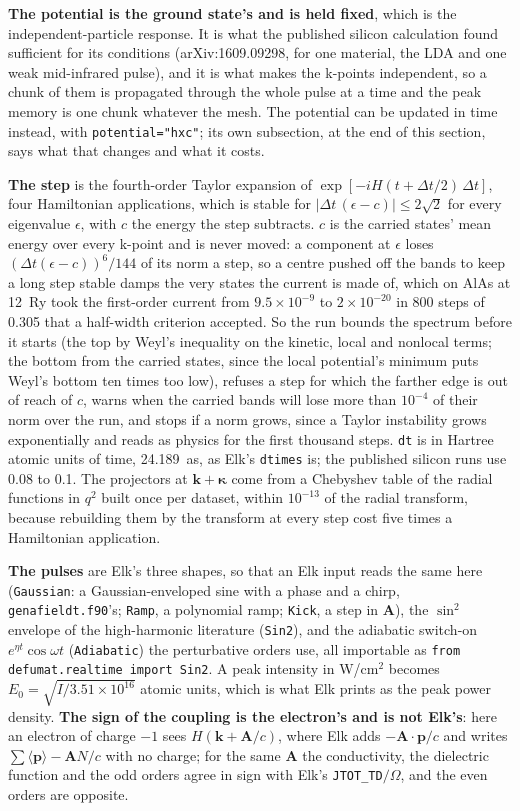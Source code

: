 \documentclass[11pt,a4paper]{article}
\newcommand{\code}[1]{\texttt{\small #1}}
\begin{document}
\textbf{The potential is the ground state's and is held fixed}, which is the
independent-particle response. It is what the published silicon calculation
found sufficient for its conditions (arXiv:1609.09298, for one material, the
LDA and one weak mid-infrared pulse), and it is what makes the k-points
independent, so a chunk of them is propagated through the whole pulse at a
time and the peak memory is one chunk whatever the mesh. The potential can be
updated in time instead, with \code{potential="hxc"}; its own subsection, at the
end of this section, says what that changes and what it costs.

\textbf{The step} is the fourth-order Taylor expansion of
$\exp[-iH(t+\Delta t/2)\,\Delta t]$, four Hamiltonian applications, which is
stable for $|\Delta t\,(\epsilon-c)| \le 2\sqrt2$ for every eigenvalue $\epsilon$,
with $c$ the energy the step subtracts. $c$ is the carried states' mean energy
over every k-point and is never moved: a component at $\epsilon$ loses
$(\Delta t(\epsilon-c))^6/144$ of its norm a step, so a centre pushed off the
bands to keep a long step stable damps the very states the current is made of,
which on AlAs at 12~Ry took the first-order current from $9.5\times10^{-9}$ to
$2\times10^{-20}$ in 800 steps of 0.305 that a half-width criterion accepted. So
the run bounds the spectrum before it starts (the top by Weyl's inequality on the
kinetic, local and nonlocal terms; the bottom from the carried states, since the
local potential's minimum puts Weyl's bottom ten times too low), refuses a step
for which the farther edge is out of reach of $c$, warns when the carried bands
will lose more than $10^{-4}$ of their norm over the run, and stops if a norm
grows, since a Taylor instability grows exponentially and reads as physics for
the first thousand steps. \code{dt} is in Hartree atomic units of time, 24.189~as, as Elk's
\code{dtimes} is; the published silicon runs use 0.08 to 0.1. The projectors at
$\mathbf k+\boldsymbol\kappa$ come from a Chebyshev table of the radial
functions in $q^2$ built once per dataset, within $10^{-13}$ of the radial
transform, because rebuilding them by the transform at every step cost five
times a Hamiltonian application.

\textbf{The pulses} are Elk's three shapes, so that an Elk input reads the same
here (\code{Gaussian}: a Gaussian-enveloped sine with a phase and a chirp,
\code{genafieldt.f90}'s; \code{Ramp}, a polynomial ramp; \code{Kick}, a step in
$\mathbf A$), the $\sin^2$ envelope of the high-harmonic literature
(\code{Sin2}), and the adiabatic switch-on $e^{\eta t}\cos\omega t$
(\code{Adiabatic}) the perturbative orders use, all importable as
\code{from defumat.realtime import Sin2}. A peak intensity in W/cm$^2$ becomes
$E_0 = \sqrt{I/3.51\times10^{16}}$ atomic units, which is what Elk prints as the
peak power density. \textbf{The sign of the coupling is the electron's and is not
Elk's}: here an electron of charge $-1$ sees $H(\mathbf k+\mathbf A/c)$, where
Elk adds $-\mathbf A\cdot\mathbf p/c$ and writes $\sum\langle\mathbf p\rangle -
\mathbf A N/c$ with no charge; for the same $\mathbf A$ the conductivity, the
dielectric function and the odd orders agree in sign with Elk's
\code{JTOT\_TD}$/\Omega$, and the even orders are opposite.
\end{document}
